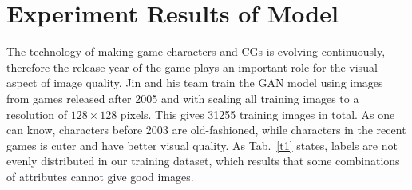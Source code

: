 \documentclass[10pt,twocolumn,letterpaper]{article}
\begin{document}
\section{Experiment Results of Model}

The technology of making game characters and CGs is evolving continuously, therefore the release year of the game plays an important role for the visual aspect of image quality. Jin and his team train the GAN model using images from games released after 2005 and with scaling all training images to a resolution of $128\times 128$ pixels. This gives 31255 training images in total. As one can know, characters before 2003 are old-fashioned, while characters in the recent games is cuter and have better visual quality. As Tab.~\ref{t1} states, labels are not evenly distributed in our training dataset, which results that some combinations of attributes cannot give good images. 

{\small


}
\end{document}
